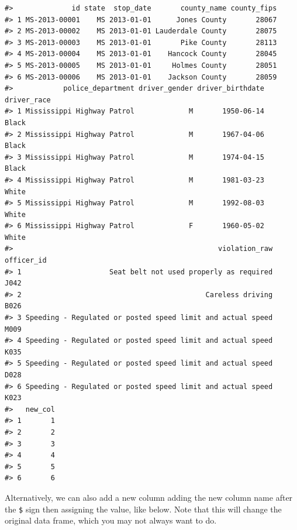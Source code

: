 \documentclass[
]{book}
\newenvironment{Shaded}{\begin{snugshade}}{\end{snugshade}}
\newcommand{\CommentTok}[1]{\textcolor[rgb]{0.56,0.35,0.01}{\textit{#1}}}
\newcommand{\DecValTok}[1]{\textcolor[rgb]{0.00,0.00,0.81}{#1}}
\newcommand{\KeywordTok}[1]{\textcolor[rgb]{0.13,0.29,0.53}{\textbf{#1}}}
\newcommand{\NormalTok}[1]{#1}
\newcommand{\OperatorTok}[1]{\textcolor[rgb]{0.81,0.36,0.00}{\textbf{#1}}}
\newcommand{\OtherTok}[1]{\textcolor[rgb]{0.56,0.35,0.01}{#1}}
\newcommand{\StringTok}[1]{\textcolor[rgb]{0.31,0.60,0.02}{#1}}
\begin{document}
\begin{verbatim}
#>              id state  stop_date       county_name county_fips
#> 1 MS-2013-00001    MS 2013-01-01      Jones County       28067
#> 2 MS-2013-00002    MS 2013-01-01 Lauderdale County       28075
#> 3 MS-2013-00003    MS 2013-01-01       Pike County       28113
#> 4 MS-2013-00004    MS 2013-01-01    Hancock County       28045
#> 5 MS-2013-00005    MS 2013-01-01     Holmes County       28051
#> 6 MS-2013-00006    MS 2013-01-01    Jackson County       28059
#>            police_department driver_gender driver_birthdate driver_race
#> 1 Mississippi Highway Patrol             M       1950-06-14       Black
#> 2 Mississippi Highway Patrol             M       1967-04-06       Black
#> 3 Mississippi Highway Patrol             M       1974-04-15       Black
#> 4 Mississippi Highway Patrol             M       1981-03-23       White
#> 5 Mississippi Highway Patrol             M       1992-08-03       White
#> 6 Mississippi Highway Patrol             F       1960-05-02       White
#>                                                 violation_raw officer_id
#> 1                     Seat belt not used properly as required       J042
#> 2                                            Careless driving       B026
#> 3 Speeding - Regulated or posted speed limit and actual speed       M009
#> 4 Speeding - Regulated or posted speed limit and actual speed       K035
#> 5 Speeding - Regulated or posted speed limit and actual speed       D028
#> 6 Speeding - Regulated or posted speed limit and actual speed       K023
#>   new_col
#> 1       1
#> 2       2
#> 3       3
#> 4       4
#> 5       5
#> 6       6
\end{verbatim}

Alternatively, we can also add a new column adding the new column name after the \texttt{\$} sign then assigning the value, like below. Note that this will change the original data frame, which you may not always want to do.

\begin{Shaded}
\end{Shaded}
\end{document}
